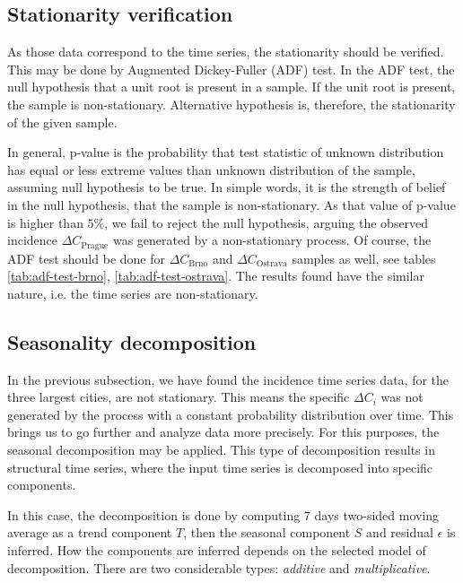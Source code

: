 \documentclass[
  digital, %
  oneside, %
  lof,     %
  lot,     %
]{fithesis4}
\begin{document}
\subsection{Stationarity verification}

As those data correspond to the time series, the stationarity 
should be verified. 
This may be done by Augmented Dickey-Fuller (ADF) test. 
In the  ADF test, the null hypothesis that a unit root is 
present in a sample. 
If the unit root is present, the sample is non-stationary. 
Alternative hypothesis is, therefore, the stationarity of 
the given sample.



In general, p-value is the probability that test statistic 
of unknown distribution has equal or less extreme values 
than unknown distribution of the sample, assuming null 
hypothesis to be true. In simple words, it is the strength 
of belief in the null hypothesis, that the sample is 
non-stationary. 
As that value of p-value is higher than $5\%$, we fail to reject 
the null hypothesis, arguing the observed incidence 
$\Delta C_{\text{Prague}}$ was generated by a non-stationary 
process. 
Of course, the ADF test should be done for $\Delta C_{\text{Brno}}$ 
and $\Delta C_{\text{Ostrava}}$ samples as well, 
see tables \ref{tab:adf-test-brno}, \ref{tab:adf-test-ostrava}.
The results found have the similar nature, i.e.
the time series are non-stationary.

\subsection{Seasonality decomposition}

In the previous subsection, we have found the incidence time 
series data, for the three largest cities, are not stationary. 
This means the specific $\Delta C_i$ was not generated by the 
process with a constant probability distribution over time. 
This brings us to go further and analyze data more precisely. 
For this purposes, the seasonal decomposition may be applied. 
This type of decomposition results in structural time series, 
where the input time series is decomposed into specific 
components.

In this case, the decomposition is done by computing 7 days 
two-sided moving average as a trend component $T$, then the 
seasonal component $S$ and residual $\epsilon$ is inferred. 
How the components are inferred depends on the selected model 
of decomposition. There are two considerable types: 
\textit{additive} and \textit{multiplicative}.
\end{document}
